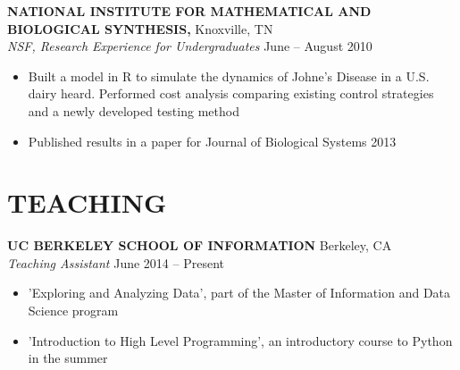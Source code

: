 \documentclass[margin]{res}
\begin{document}
\begin{resume}
{\bf NATIONAL INSTITUTE FOR MATHEMATICAL AND BIOLOGICAL SYNTHESIS,} Knoxville, TN \\
{\em NSF, Research Experience for Undergraduates}    \hfill
June -- August 2010 \\                                          \vspace{-4mm}
\begin{itemize}                                         \itemsep1pt 
        \item Built a model in R to simulate the dynamics of Johne's Disease in a U.S. dairy heard. Performed cost analysis comparing existing control strategies and a newly developed testing method
        \item Published results in a paper for Journal of Biological Systems
2013\end{itemize}
\vspace{-2mm}


\section{TEACHING}
{\bf UC BERKELEY SCHOOL OF INFORMATION} Berkeley, CA \\
{\em Teaching Assistant} \hfill
June 2014 -- Present \\                                          \vspace{-4mm}
\begin{itemize}                                         \itemsep1pt %
        \item   'Exploring and Analyzing Data', part of the Master of Information and Data Science program
        \item   'Introduction to High Level Programming', an introductory course to Python in the summer
\end{itemize}
\vspace{-2mm}


\end{resume}
\end{document}
